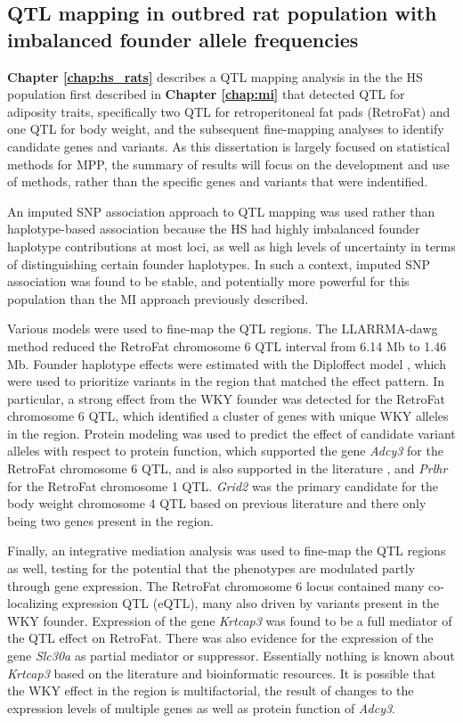 \subsection{QTL mapping in outbred rat population with imbalanced founder allele frequencies}

\textbf{Chapter \ref{chap:hs_rats}} describes a QTL mapping analysis in the the HS population first described in \textbf{Chapter \ref{chap:mi}} that detected QTL for adiposity traits, specifically two QTL for retroperitoneal fat pads (RetroFat) and one QTL for body weight, and the subsequent fine-mapping analyses to identify candidate genes and variants. As this dissertation is largely focused on statistical methods for MPP, the summary of results will focus on the development and use of methods, rather than the specific genes and variants that were indentified. 

An imputed SNP association approach to QTL mapping was used rather than haplotype-based association because the HS had highly imbalanced founder haplotype contributions at most loci, as well as high levels of uncertainty in terms of distinguishing certain founder haplotypes. In such a context, imputed SNP association was found to be stable, and potentially more powerful for this population than the MI approach previously described.

Various models were used to fine-map the QTL regions. The LLARRMA-dawg method \citep{Sabourin2015} reduced the RetroFat chromosome 6 QTL interval from 6.14 Mb to 1.46 Mb. Founder haplotype effects were estimated with the Diploffect model \citep{Zhang2014}, which were used to prioritize variants in the region that matched the effect pattern. In particular, a strong effect from the WKY founder was detected for the RetroFat chromosome 6 QTL, which identified a cluster of genes with unique WKY alleles in the region. Protein modeling \citep{Prokop2017} was used to predict the effect of candidate variant alleles with respect to protein function, which supported the gene \textit{Adcy3} for the RetroFat chromosome 6 QTL, and is also supported in the literature \citep{Speliotes2010, Nordman2008, Stergiakouli2014, Wen2012}, and \textit{Prlhr} for the RetroFat chromosome 1 QTL. \textit{Grid2} was the primary candidate for the body weight chromosome 4 QTL based on previous literature \citep{Dietrich2013,Locke2015} and there only being two genes present in the region.

Finally, an integrative mediation analysis was used to fine-map the QTL regions as well, testing for the potential that the phenotypes are modulated partly through gene expression. The RetroFat chromosome 6 locus contained many co-localizing expression QTL (eQTL), many also driven by variants present in the WKY founder. Expression of the gene \textit{Krtcap3} was found to be a full mediator of the QTL effect on RetroFat. There was also evidence for the expression of the gene \textit{Slc30a} as partial mediator or suppressor. Essentially nothing is known about \textit{Krtcap3} based on the literature and bioinformatic resources. It is possible that the WKY effect in the region is multifactorial, the result of changes to the expression levels of multiple genes as well as protein function of \textit{Adcy3}.

